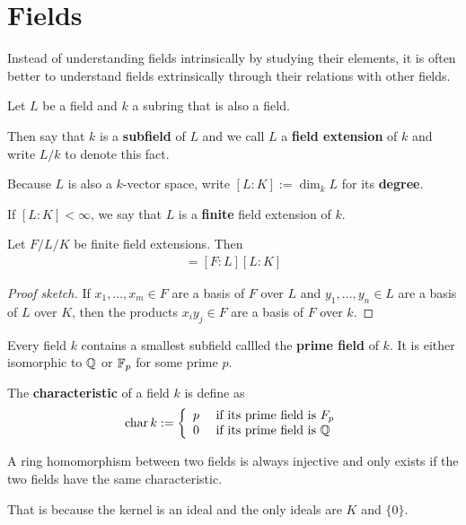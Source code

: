 \section{Fields}
Instead of understanding fields intrinsically by studying their elements, it is often better to understand fields extrinsically through their relations with other fields.

\begin{dfn}[]
  Let $L$ be a field and $k$ a subring that is also a field.

  Then say that $k$ is a \textbf{subfield} of $L$ and we call $L$ a \textbf{field extension} of $k$ and write $L/k$ to denote this fact.

  Because $L$ is also a $k$-vector space, write $[L:K] := \dim_k L$ for its \textbf{degree}.

  If $[L:K] < \infty$, we say that $L$ is a \textbf{finite} field extension of $k$.

\end{dfn}


\begin{lem}
  Let $F/L/K$ be finite field extensions. Then
  \begin{align*}
    [F:K] = [F:L] [L:K]
  \end{align*}
\end{lem}
\begin{proof}[Proof sketch]
  If $x_{1}, \ldots, x_{m} \in F$ are a basis of $F$ over $L$ and $y_{1}, \ldots, y_{n} \in L$ are a basis of $L$ over $K$, then the products $x_iy_j \in F$ are a basis of $F$ over $k$.
\end{proof}

\begin{dfn}[]
  Every field $k$ contains a smallest subfield callled the \textbf{prime field} of $k$.
  It is either isomorphic to $\mathbb{Q}$ or $\mathbb{F}_p$ for some prime $p$.

  The \textbf{characteristic} of a field $k$ is define as
  \begin{align*}
    \operatorname{char} k := 
    \left\{\begin{array}{ll}
        p & \text{ if its prime field is } F_p\\
        0 & \text{ if its prime field is } \mathbb{Q}
    \end{array} \right.
  \end{align*}
\end{dfn}

\begin{prop}[]
  A ring homomorphism between two fields is always injective and only exists if the two fields have the same characteristic.
\end{prop}
That is because the kernel is an ideal and the only ideals are $K$ and $\{0\}$.

